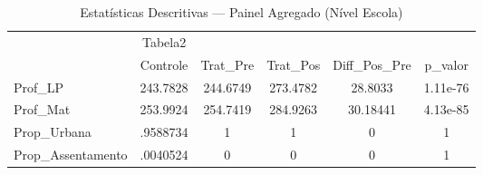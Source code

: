 \begin{table}[htbp]\centering
\caption{Estatísticas Descritivas --- Painel Agregado (Nível Escola)}
\begin{tabular}{l*{5}{c}}
\toprule
            &     Tabela2&            &            &            &            \\
            &    Controle&    Trat\_Pre&    Trat\_Pos&Diff\_Pos\_Pre&     p\_valor\\
\midrule
Prof\_LP     &    243.7828&    244.6749&    273.4782&     28.8033&    1.11e-76\\
Prof\_Mat    &    253.9924&    254.7419&    284.9263&    30.18441&    4.13e-85\\
Prop\_Urbana &    .9588734&           1&           1&           0&           1\\
Prop\_Assentamento&    .0040524&           0&           0&           0&           1\\
\bottomrule
\end{tabular}
\end{table}
